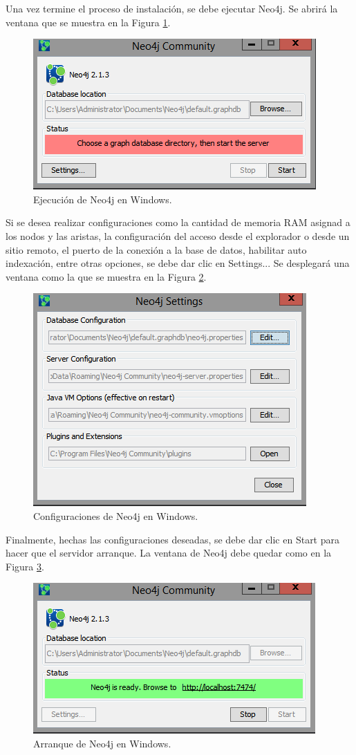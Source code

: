 \documentclass[conference]{IEEEtran}
\begin{document}
Una vez termine el proceso de instalación, se debe ejecutar Neo4j. Se abrirá la ventana que se muestra en la Figura \ref{fig4}.

\begin{figure}[H]
\begin{center}
\includegraphics[width= 0.45 \textwidth]{neo4j_install06.png}
\end{center}
\caption{Ejecución de Neo4j en Windows.}
\label{fig4}
\end{figure}

Si se desea realizar configuraciones como
la cantidad de memoria RAM asignad a los nodos y las aristas, la configuración del acceso desde el explorador o desde un sitio remoto, el puerto de la conexión a la base de datos, habilitar auto indexación, entre otras opciones, se debe dar clic en Settings... Se desplegará una ventana como la que se muestra en la Figura \ref{fig5}.

\begin{figure}[H]
\begin{center}
\includegraphics[width= 0.45 \textwidth]{neo4j_install07.png}
\end{center}
\caption{Configuraciones de Neo4j en Windows.}
\label{fig5}
\end{figure}

Finalmente, hechas las configuraciones deseadas, se debe dar clic en Start para hacer que el servidor arranque. La ventana de Neo4j debe quedar como en la Figura \ref{fig6}.

\begin{figure}[H]
\begin{center}
\includegraphics[width= 0.45 \textwidth]{neo4j_install09.png}
\end{center}
\caption{Arranque de Neo4j en Windows.}
\label{fig6}
\end{figure}
\end{document}
